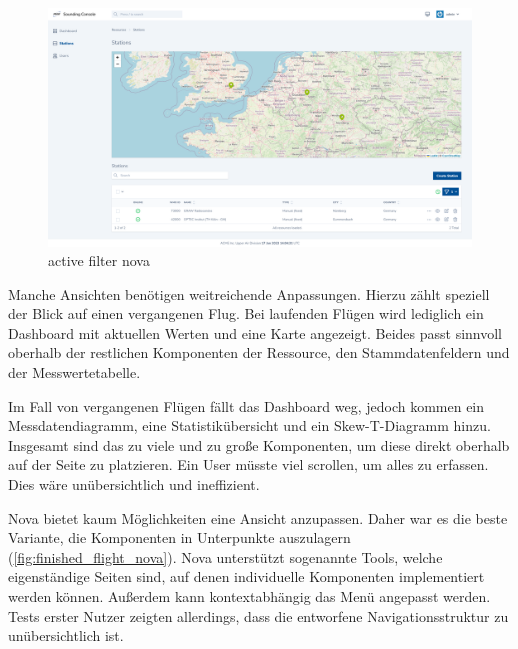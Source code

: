 \begin{figure}[h!]
    \centering
    \caption{active filter nova}
    \label{fig:active_filter_nova}
    \includegraphics[scale=0.25]{assets/active_filter_nova}
\end{figure}

\newpage

Manche Ansichten benötigen weitreichende Anpassungen.
Hierzu zählt speziell der Blick auf einen vergangenen Flug.
Bei laufenden Flügen wird lediglich ein Dashboard mit aktuellen Werten und eine Karte angezeigt.
Beides passt sinnvoll oberhalb der restlichen Komponenten der Ressource, den Stammdatenfeldern und der Messwertetabelle.

Im Fall von vergangenen Flügen fällt das Dashboard weg, jedoch kommen ein Messdatendiagramm, eine Statistikübersicht und ein Skew-T-Diagramm hinzu.
Insgesamt sind das zu viele und zu große Komponenten, um diese direkt oberhalb auf der Seite zu platzieren.
Ein User müsste viel scrollen, um alles zu erfassen.
Dies wäre unübersichtlich und ineffizient.

Nova bietet kaum Möglichkeiten eine Ansicht anzupassen.
Daher war es die beste Variante, die Komponenten in Unterpunkte auszulagern (\ref{fig:finished_flight_nova}).
Nova unterstützt sogenannte Tools, welche eigenständige Seiten sind, auf denen individuelle Komponenten implementiert werden können.
Außerdem kann kontextabhängig das Menü angepasst werden.
Tests erster Nutzer zeigten allerdings, dass die entworfene Navigationsstruktur zu unübersichtlich ist.

\newpage

